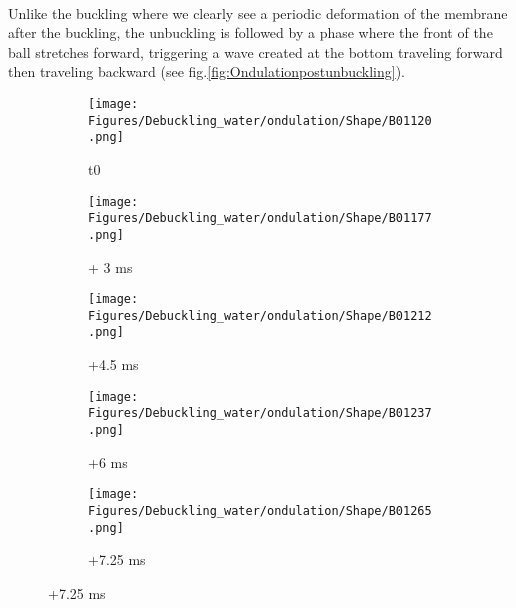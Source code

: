 \documentclass[a4paper,10pt]{report}
\begin{document}
\paragraph{}
Unlike the buckling where we clearly see a periodic deformation of the membrane after the buckling, the unbuckling is followed by a phase where the front of the ball stretches forward, triggering a wave created at the bottom traveling forward then traveling backward (see fig.\ref{fig:Ondulationpostunbuckling}).
\begin{figure}[htbp]%
	\centering%
	 \begin{subfigure}[h]{0.2\textwidth}%
        \texttt{[image: Figures/Debuckling\_water/ondulation/Shape/B01120.png]}%
        \caption{t0}%
				\label{fig:UnbucklingVelocityField}%
    \end{subfigure}%
		\begin{subfigure}[h]{0.2\textwidth}%
        \texttt{[image: Figures/Debuckling\_water/ondulation/Shape/B01177.png]}%
        \caption{+ 3 ms}%
				\label{fig:UnbucklingVelocityField}%
    \end{subfigure}%
		\begin{subfigure}[h]{0.2\textwidth}%
        \texttt{[image: Figures/Debuckling\_water/ondulation/Shape/B01212.png]}%
        \caption{+4.5 ms}%
				\label{fig:UnbucklingVelocityField}%
    \end{subfigure}%
		\begin{subfigure}[h]{0.2\textwidth}%
        \texttt{[image: Figures/Debuckling\_water/ondulation/Shape/B01237.png]}%
        \caption{+6 ms}%
				\label{fig:UnbucklingVelocityField}%
    \end{subfigure}%
		\begin{subfigure}[h]{0.2\textwidth}%
        \texttt{[image: Figures/Debuckling\_water/ondulation/Shape/B01265.png]}%
        \caption{+7.25 ms}%
				\label{fig:UnbucklingVelocityField}%
    \end{subfigure}%
    

\end{figure}
\end{document}
